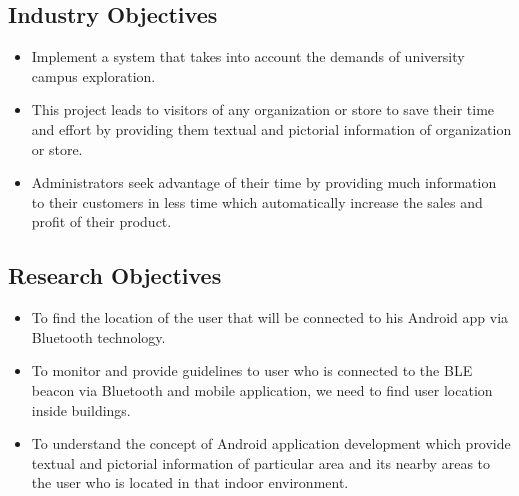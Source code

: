 \subsection{Industry Objectives}
\begin{itemize}
\item Implement a system that takes into account the demands of university campus exploration.
\item This project leads to visitors of any organization or store to save their time and effort by providing them textual and pictorial information of organization or store.
\item Administrators seek advantage of their time by providing much information to their customers in less time which automatically increase the sales and profit of their product.

\end{itemize}
\subsection{Research Objectives}
\begin{itemize}
\item To find the location of the user that will be connected to his Android app via Bluetooth technology\cite{Introduction}.
\item To monitor and provide guidelines to user who is connected to the BLE beacon via Bluetooth and mobile application, we need to find user location inside buildings.
\item To understand the concept of Android application development which provide textual and pictorial information of particular area and its nearby areas to the user who is located in that indoor environment.


\end{itemize}
